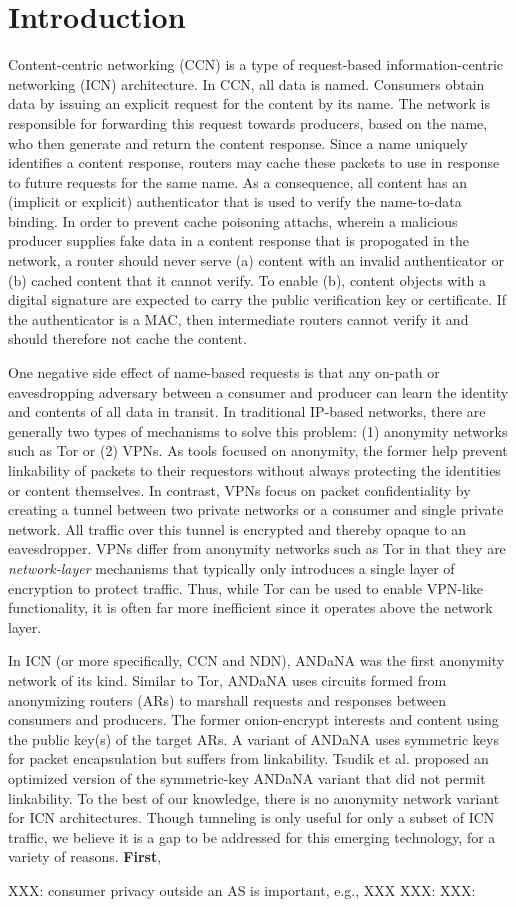 \section{Introduction}
Content-centric networking (CCN) is a type of request-based information-centric
networking (ICN) architecture. In CCN, all data is named. Consumers obtain data
by issuing an explicit request for the content by its name. The network is
responsible for forwarding this request towards producers, based on the name,
who then generate and return the content response. Since a name uniquely identifies
a content response, routers may cache these packets to use in response to
future requests for the same name. As a consequence, all content has an (implicit
or explicit) authenticator that is used to verify the name-to-data binding. In
order to prevent cache poisoning attachs, wherein a malicious producer supplies
fake data in a content response that is propogated in the network, a router
should never serve (a) content with an invalid authenticator or (b) cached
content that it cannot verify. To enable (b), content objects with a digital
signature are expected to carry the public verification key or certificate. If the
authenticator is a MAC, then intermediate routers cannot verify it and should
therefore not cache the content.

One negative side effect of name-based requests is that any on-path or 
eavesdropping adversary between a consumer and producer can learn the identity
and contents of all data in transit. In traditional IP-based networks, there are
generally two types of mechanisms to solve this problem: (1) anonymity
networks such as Tor \cite{tor} or (2) VPNs. As tools focused on anonymity, 
the former help prevent linkability of packets to their requestors without 
always protecting the identities or content themselves. In contrast, VPNs focus
on packet confidentiality by creating a tunnel between two private networks
or a consumer and single private network. All traffic over this tunnel is
encrypted and thereby opaque to an eavesdropper. VPNs differ from anonymity
networks such as Tor in that they are \emph{network-layer} mechanisms that
typically only introduces a single layer of encryption to protect traffic.
Thus, while Tor can be used to enable VPN-like functionality, it is often 
far more inefficient since it operates above the network layer.

In ICN (or more specifically, CCN and NDN), ANDaNA was the first anonymity network of its 
kind. Similar to Tor, ANDaNA uses circuits formed from anonymizing routers (ARs)
to marshall requests and responses between consumers and producers. The former
onion-encrypt interests and content using the public key(s) of the target ARs.
A variant of ANDaNA uses symmetric keys for packet encapsulation but suffers from
linkability. Tsudik et al. \cite{ac3n} proposed an optimized version of the symmetric-key
ANDaNA variant that did not permit linkability. To the best of our knowledge, there
is no anonymity network variant for ICN architectures. Though tunneling is only 
useful for only a subset of ICN traffic, we believe it is a gap to be addressed 
for this emerging technology, for a variety of reasons. {\bf First}, 

XXX: consumer privacy outside an AS is important, e.g., XXX
XXX: 
XXX: 



